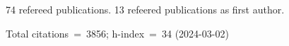 74 refereed publications. 13 refeered publications as first author.

Total citations~=~3856; h-index~=~34 (2024-03-02)